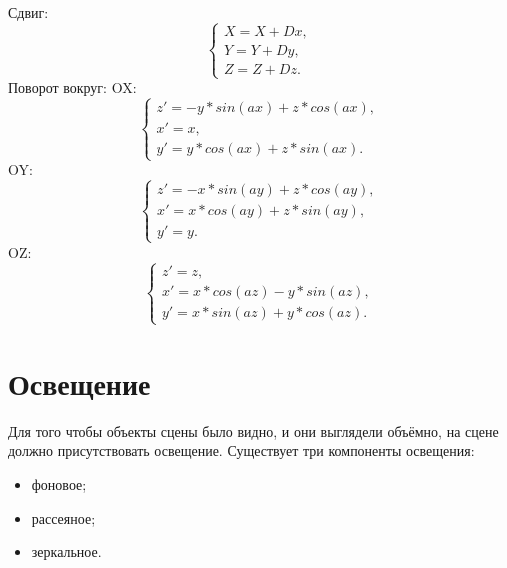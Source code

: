 \documentclass[a4paper,14pt]{report}
\begin{document}
Сдвиг:
\begin{equation}
\begin{cases}
 X=X+Dx,
 \\
 Y=Y+Dy,
 \\
 Z=Z+Dz.  
\end{cases}
 \label{eq8:ref}                  
 \end{equation}                                                                                              
Поворот вокруг:
\newline
    OX:
    \begin{equation}
    \begin{cases}
  z'= -y*sin(ax)+z*cos(ax),
  \\
  x'= x,
  \\
  y'= y*cos(ax)+z*sin(ax).
 \end{cases}
 \label{eq7:ref}                  
 \end{equation}                                                                 
    OY:
    \begin{equation}
    \begin{cases}
  z'= -x*sin(ay)+z*cos(ay),
  \\
  x'= x*cos(ay)+z*sin(ay),
  \\
  y'= y.
 \end{cases}
 \label{eq6:ref}                  
 \end{equation} 
    OZ:
    \begin{equation}
    \begin{cases}
  z'= z,
  \\
  x'= x*cos(az)-y*sin(az),
  \\                                                             
  y'= x*sin(az)+y*cos(az).  
 \end{cases}                                                              
 \label{eq5:ref}                  
 \end{equation} 

\section{Освещение}
Для того чтобы объекты сцены было видно, и они выглядели объёмно, на сцене должно присутствовать освещение.
Существует три компоненты освещения:
\begin{itemize}
\item фоновое;
\item рассеяное;
\item зеркальное.
\end{itemize}
\end{document}
